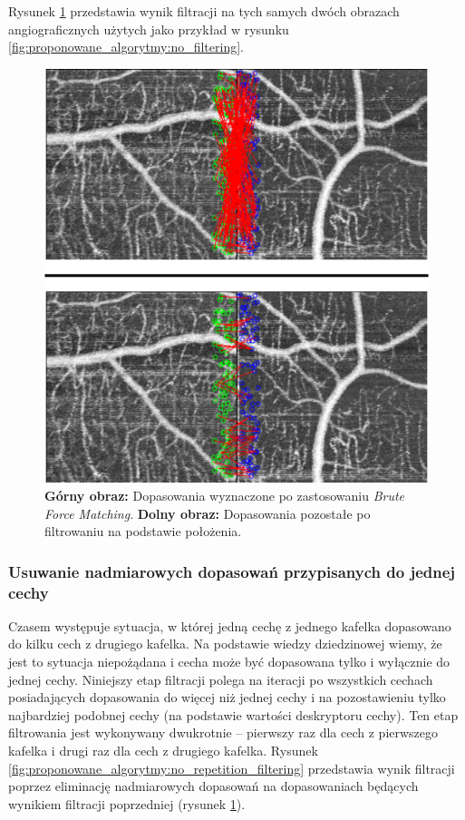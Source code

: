Rysunek \ref{fig:proponowane_algorytmy:after_placement} przedstawia wynik filtracji na tych samych dwóch obrazach angiograficznych użytych jako przykład w rysunku \ref{fig:proponowane_algorytmy:no_filtering}.

\begin{figure}[htb]
  \centering
  \includegraphics[width=\textwidth]{gfx/after_placement}
  \caption{\textbf{Górny obraz:} Dopasowania wyznaczone po zastosowaniu \textit{Brute Force Matching}. \textbf{Dolny obraz:} Dopasowania pozostałe po filtrowaniu na podstawie położenia.}
  \label{fig:proponowane_algorytmy:after_placement}
\end{figure}

\subsubsection{Usuwanie nadmiarowych dopasowań przypisanych do jednej cechy}
\label{sec:proponowane_algorytmy:no_repetition_filtering}

Czasem występuje sytuacja, w której jedną cechę z jednego kafelka dopasowano do kilku cech z drugiego kafelka. Na podstawie wiedzy dziedzinowej wiemy, że jest to sytuacja niepożądana i cecha może być dopasowana tylko i wyłącznie do jednej cechy. Niniejszy etap filtracji polega na iteracji po wszystkich cechach posiadających dopasowania do więcej niż jednej cechy i na pozostawieniu tylko najbardziej podobnej cechy (na podstawie wartości deskryptoru cechy). Ten etap filtrowania jest wykonywany dwukrotnie -- pierwszy raz dla cech z pierwszego kafelka i drugi raz dla cech z drugiego kafelka. Rysunek \ref{fig:proponowane_algorytmy:no_repetition_filtering} przedstawia wynik filtracji poprzez eliminację nadmiarowych dopasowań na dopasowaniach będących wynikiem filtracji poprzedniej (rysunek \ref{fig:proponowane_algorytmy:after_placement}).

